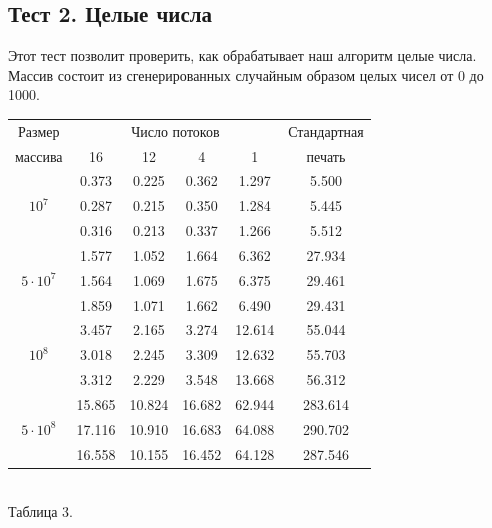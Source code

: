 \subsection{Тест 2. Целые числа}
Этот тест позволит проверить, как обрабатывает наш алгоритм целые числа. 
Массив состоит из сгенерированных случайным образом целых чисел от 0 до 1000.
\begin{center}
\begin{tabular}{||c|c|c|c|c|c||}
\hline
\hline
Размер & \multicolumn{4}{c|}{Число потоков} & Стандартная\\
\hhline{~|-|-|-|-|~|}
массива & 16 & 12 & 4 & 1 & печать \\
\hline
\hline
 & 0.373 & 0.225 & 0.362 & 1.297 & 5.500 \\
\hhline{~|-|-|-|-|-|}
$10^7$ & 0.287 & 0.215 & 0.350 & 1.284 & 5.445 \\
\hhline{~|-|-|-|-|-|}
 & 0.316 & 0.213 & 0.337 & 1.266 & 5.512 \\
\hline
 & 1.577 & 1.052 & 1.664 & 6.362 & 27.934 \\
\hhline{~|-|-|-|-|-|}
$5 \cdot 10^7$ & 1.564 & 1.069 & 1.675 & 6.375 & 29.461 \\
\hhline{~|-|-|-|-|-|}
 & 1.859 & 1.071 & 1.662 & 6.490 & 29.431 \\
\hline
 & 3.457 & 2.165 & 3.274 & 12.614 & 55.044 \\
\hhline{~|-|-|-|-|-|}
$10^8$ & 3.018 & 2.245 & 3.309 & 12.632 & 55.703 \\
\hhline{~|-|-|-|-|-|}
 & 3.312 & 2.229 & 3.548 & 13.668 & 56.312 \\
\hline
 & 15.865 & 10.824 & 16.682 & 62.944 & 283.614 \\
\hhline{~|-|-|-|-|-|}
$5 \cdot 10^8$ & 17.116 & 10.910 & 16.683 & 64.088 & 290.702 \\
\hhline{~|-|-|-|-|-|}
 & 16.558 & 10.155 & 16.452 & 64.128 & 287.546 \\
\hline
\hline
\end{tabular}
\\\vspace{10pt}
\small{Таблица 3.}
\end{center}

